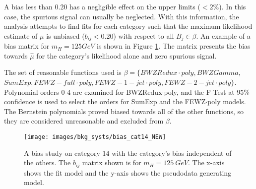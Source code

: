 A bias less than 0.20 has a negligible effect on the upper limits ($<2\%$). In this case, the spurious signal can usually be neglected. With this information, the analysis attempts to find fits for each category such that the maximum likelihood estimate of $\mu$ is unbiased ($b_{ij} < 0.20$) with respect to all $B_j \in \beta$. An example of a bias matrix for $m_H=125 GeV$ is shown in Figure \ref{fig:bias_1}. The matrix presents the bias towards $\hat{\mu}$ for the category's likelihood alone and zero spurious signal. 

The set of reasonable functions used is $\beta = \{BWZRedux\cdot poly, BWZGamma,$ 
$SumExp, FEWZ-full\cdot poly, FEWZ-1-jet\cdot poly, FEWZ-2-jet\cdot poly\}$. Polynomial orders 0-4 are examined for BWZRedux$\cdot$poly, and the F-Test at 95\% confidence is used to select the orders for SumExp and the FEWZ$\cdot$poly models. The Bernstein polynomials proved biased towards all of the other functions, so they are considered unreasonable and excluded from $\beta$. 
\begin{figure}[h!]
    \centering
    \texttt{[image: images/bkg\_systs/bias\_cat14\_NEW]}
    \caption[Background bias study on category 14.]
        {A bias study on category 14 with the category's bias independent of the others.
        The $b_{ij}$ matrix shown is for $m_H=125\ GeV$.
        The x-axis shows the fit model and the y-axis shows the pseudodata generating model.}
    \label{fig:bias_1}
\end{figure}
